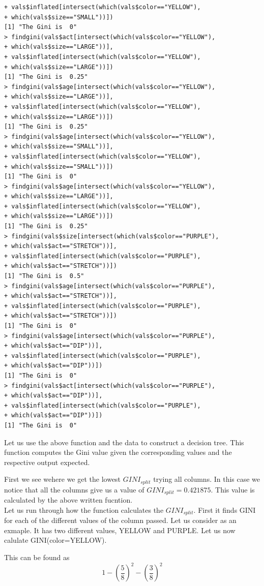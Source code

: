 \documentclass[fontsize=10pt]{scrartcl}
\begin{document}
\begin{enumerate}
\begin{verbatim}
+ vals$inflated[intersect(which(vals$color=="YELLOW"),
+ which(vals$size=="SMALL"))])
[1] "The Gini is  0"
> findgini(vals$act[intersect(which(vals$color=="YELLOW"),
+ which(vals$size=="LARGE"))],
+ vals$inflated[intersect(which(vals$color=="YELLOW"),
+ which(vals$size=="LARGE"))])
[1] "The Gini is  0.25"
> findgini(vals$age[intersect(which(vals$color=="YELLOW"),
+ which(vals$size=="LARGE"))],
+ vals$inflated[intersect(which(vals$color=="YELLOW"),
+ which(vals$size=="LARGE"))])
[1] "The Gini is  0.25"
> findgini(vals$age[intersect(which(vals$color=="YELLOW"),
+ which(vals$size=="SMALL"))],
+ vals$inflated[intersect(which(vals$color=="YELLOW"),
+ which(vals$size=="SMALL"))])
[1] "The Gini is  0"
> findgini(vals$age[intersect(which(vals$color=="YELLOW"),
+ which(vals$size=="LARGE"))],
+ vals$inflated[intersect(which(vals$color=="YELLOW"),
+ which(vals$size=="LARGE"))])
[1] "The Gini is  0.25"
> findgini(vals$size[intersect(which(vals$color=="PURPLE"),
+ which(vals$act=="STRETCH"))],
+ vals$inflated[intersect(which(vals$color=="PURPLE"),
+ which(vals$act=="STRETCH"))])
[1] "The Gini is  0.5"
> findgini(vals$age[intersect(which(vals$color=="PURPLE"),
+ which(vals$act=="STRETCH"))],
+ vals$inflated[intersect(which(vals$color=="PURPLE"),
+ which(vals$act=="STRETCH"))])
[1] "The Gini is  0"
> findgini(vals$age[intersect(which(vals$color=="PURPLE"),
+ which(vals$act=="DIP"))],
+ vals$inflated[intersect(which(vals$color=="PURPLE"),
+ which(vals$act=="DIP"))])
[1] "The Gini is  0"
> findgini(vals$act[intersect(which(vals$color=="PURPLE"),
+ which(vals$act=="DIP"))],
+ vals$inflated[intersect(which(vals$color=="PURPLE"),
+ which(vals$act=="DIP"))])
[1] "The Gini is  0"
\end{verbatim}
			Let us use the above function and the data to construct a decision tree. This function computes the Gini value given the corresponding values and the respective output expected.

			First we see wehere we get the lowest $GINI_{split}$ trying all columns. In this case we notice that all the columns give us a value of $GINI_{split} = 0.421875$. This value is calculated by the above written fucntion.\\
			Let us run through how the function calculates the $GINI_{split}$. First it finds GINI for each of the different values of the column passed. Let us consider as an exmaple. It has two different values, YELLOW and PURPLE. Let us now calulate GINI(color=YELLOW).

			This can be found as 
			\begin{equation*}
				1 - (\frac{5}{8})^{2} - (\frac{3}{8})^{2}
			\end{equation*}


\end{enumerate}
\end{document}

